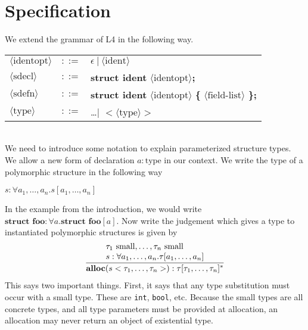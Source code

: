 \documentclass[aps,letterpaper,11pt]{revtex4}
\begin{document}
\newpage
\section{Specification}

We extend the grammar of L4 in the following way.\\

\begin{tabular}{lll}
$\langle\text{identopt}\rangle$ \hspace{.5in}	& $::=$ & $\epsilon~|~\langle\text{ident}\rangle$\\
$\langle\text{sdecl}\rangle$	& $::=$	& 	\textbf{struct ident} $\langle$identopt$\rangle$\textbf{;}\\
$\langle\text{sdefn}\rangle$	& $::=$	& 	\textbf{struct ident} $\langle$identopt$\rangle$ \textbf{\{}
											$\langle\text{field-list}\rangle$ \textbf{\};}\\
$\langle\text{type}\rangle$	& $::=$	& \ldots $|$ \textbf{$<$}$\langle\text{type}\rangle$\textbf{$>$}
\end{tabular}\\

We need to introduce some notation to explain parameterized structure types. We allow a new form of declaration
$a : \text{type}$ in our context. We write the type of a polymorphic structure in the following way

\begin{center}
$s : \forall a_1, \ldots, a_n. s[a_1, \ldots, a_n]$
\end{center}

In the example from the introduction, we would write $\textbf{struct foo} : \forall a. \textbf{struct foo}[a]$.
Now write the judgement which gives a type to instantiated polymorphic structures is given by
\[
\begin{tabular}{c}
  \infer{\textbf{alloc}(s <\tau_1, \ldots, \tau_n>) : \tau[\tau_1, \dots, \tau_n]^*}
        {	
        	{\tau_1~\text{small}, \ldots, \tau_n~\text{small}} \vspace{.1cm}\\
			{s : \forall a_1, \ldots, a_n. \tau[a_1, \ldots, a_n]}
        }
\end{tabular}
\]
This says two important things. First, it says that any type substitution must occur with a small type.
These are \texttt{int}, \texttt{bool}, etc. Because the small types are all concrete types, and all type
parameters must be provided at allocation, an allocation may never return an object of existential type.
\end{document}
